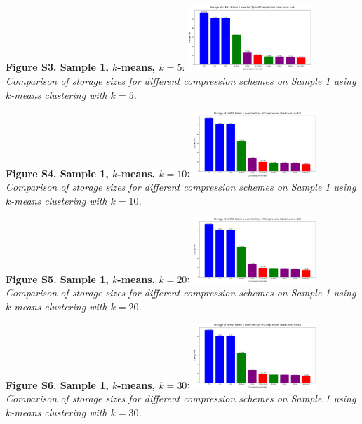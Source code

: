 \documentclass[unnumsec,webpdf,contemporary,large]{oup-authoring-template}
\begin{document}
\textbf{Figure S3. Sample 1, $k$-means, $k=5$}:
\newline
\includegraphics[width=0.35\textwidth]{compressed/kmeans/sample1/k5/storage_comparisons.png}\\
\textit{Comparison of storage sizes for different compression schemes on Sample 1 using $k$-means clustering with $k=5$.}

\textbf{Figure S4. Sample 1, $k$-means, $k=10$}:
\newline
\includegraphics[width=0.35\textwidth]{compressed/kmeans/sample1/k10/storage_comparisons.png}\\
\textit{Comparison of storage sizes for different compression schemes on Sample 1 using $k$-means clustering with $k=10$.}

\textbf{Figure S5. Sample 1, $k$-means, $k=20$}:
\newline
\includegraphics[width=0.35\textwidth]{compressed/kmeans/sample1/k20/storage_comparisons.png}\\
\textit{Comparison of storage sizes for different compression schemes on Sample 1 using $k$-means clustering with $k=20$.}

\textbf{Figure S6. Sample 1, $k$-means, $k=30$}:
\newline
\includegraphics[width=0.35\textwidth]{compressed/kmeans/sample1/k30/storage_comparisons.png}\\
\textit{Comparison of storage sizes for different compression schemes on Sample 1 using $k$-means clustering with $k=30$.}
\end{document}
